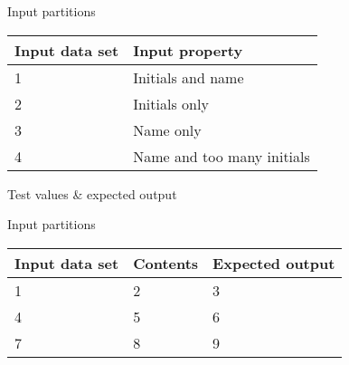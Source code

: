Input partitions
\begin{center}
  \begin{tabular}{| l | l |}
    \hline
	Input data set & Input property \\ \hline
    1 & Initials and name \\ \hline
    2 & Initials only \\ \hline
    3 & Name only \\ \hline
	4 & Name and too many initials \\
    \hline
  \end{tabular}
\end{center}

Test values \& expected output

Input partitions
\begin{center}
  \begin{tabular}{| l | l | l |}
    \hline
	Input data set & Contents & Expected output \\ \hline
    1 & 2 & 3 \\ \hline
    4 & 5 & 6 \\ \hline
    7 & 8 & 9 \\
    \hline
  \end{tabular}
\end{center}